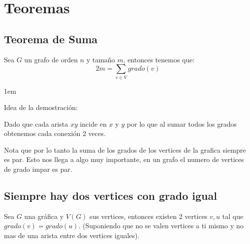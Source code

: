 \documentclass[12pt, fleqn]{report}                             %
\newenvironment{SmallIndentation}[1][0.75em]                    %
        {\begin{adjustwidth}{#1}{}\begin{footnotesize}}             %
        {\end{footnotesize}\end{adjustwidth}}                       %
\theoremstyle{break}                                            %
\begin{document}
        \clearpage
        \section{Teoremas}

            \subsection{Teorema de Suma}

                Sea $G$ un grafo de orden $n$ y tamaño $m$, entonces tenemos que:
                \begin{equation*}
                    2m = \sum_{v \in V}{grado(v)}
                \end{equation*}

                \begin{SmallIndentation}[1em]
                    Idea de la demostración:
                    
                    Dado que cada arista $xy$ incide en $x$ y $y$ por lo que al sumar todos los grados obtenemos cada conexión
                    2 veces.
                \end{SmallIndentation}

                Nota que por lo tanto la suma de los grados de los vertices de la grafica siempre es par.
                Esto nos llega a algo muy importante, en un grafo el numero de vertices de grado impar es par.
                

            \subsection{Siempre hay dos vertices con grado igual}

                Sea $G$ una gráfica y $V(G)$ sus vertices, entonces existen 2 vertices $v, u$
                tal que $grado(v) = grado(u)$. (Suponiendo que no se valen vertices a ti mismo y no mas de una
                arista entre dos vertices iguales).
\end{document}
